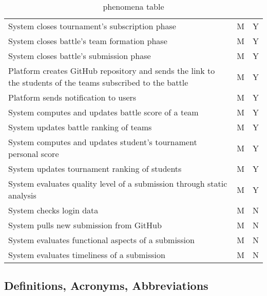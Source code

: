 \begin{table}[H]
\begin{tabular}{|p{9.5cm}|p{2cm}|p{1.5cm}|}
        System closes tournament's subscription phase & M & Y \\
        System closes battle's team formation phase & M & Y \\
        System closes battle's submission phase & M & Y \\
        Platform creates GitHub repository and sends the link to the students of the teams subscribed to the battle & M & Y \\
        Platform sends notification to users & M & Y \\
        System computes and updates battle score of a team & M & Y \\
        System  updates battle ranking of teams & M & Y \\
        System computes and updates student's tournament personal score & M & Y \\
        System  updates tournament ranking of students & M & Y \\
        System evaluates quality level of a submission through static analysis & M & Y \\
        System checks login data & M & N \\
        System pulls new submission from GitHub & M & N \\
        System evaluates functional aspects of a submission & M & N \\
        System evaluates timeliness of a submission & M & N \\
        \hline
    \end{tabular}
    \caption{phenomena table}
\end{table}
\newpage
\subsection{Definitions, Acronyms, Abbreviations}
